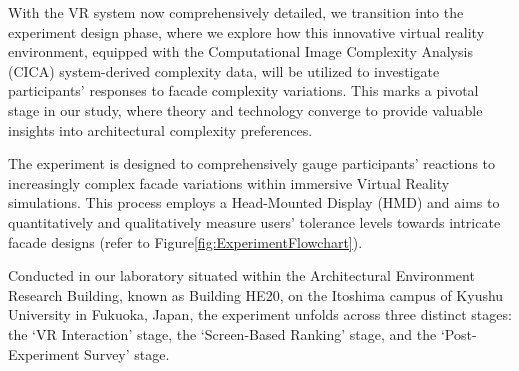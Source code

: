 %    

With the VR system now comprehensively detailed, we transition into the experiment design phase, where we explore how this innovative virtual reality environment, equipped with the Computational Image Complexity Analysis (CICA) system-derived complexity data, will be utilized to investigate participants' responses to facade complexity variations.
This marks a pivotal stage in our study, where theory and technology converge to provide valuable insights into architectural complexity preferences.

The experiment is designed to comprehensively gauge participants' reactions to increasingly complex facade variations within immersive Virtual Reality simulations.
This process employs a Head-Mounted Display (HMD) and aims to quantitatively and qualitatively measure users' tolerance levels towards intricate facade designs (refer to Figure\ref{fig:ExperimentFlowchart}).

Conducted in our laboratory situated within the Architectural Environment Research Building, known as Building HE20, on the Itoshima campus of Kyushu University in Fukuoka, Japan, the experiment unfolds across three distinct stages: the `VR Interaction' stage, the `Screen-Based Ranking' stage, and the `Post-Experiment Survey' stage.

